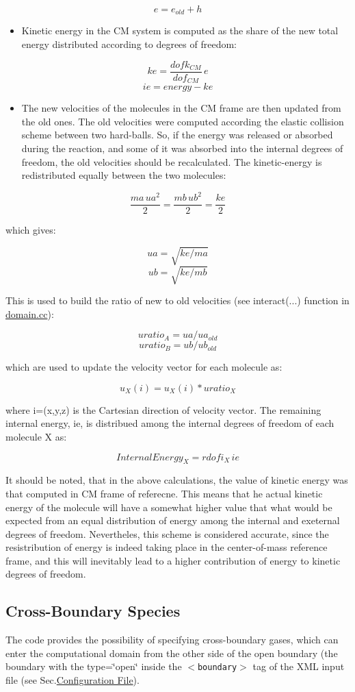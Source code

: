 \[ e = e_{old} + h \]

\begin{itemize}
\item Kinetic energy in the CM system is computed as the share of the new total energy distributed according to degrees of freedom:\end{itemize}


\[ ke = \frac{dofk_{CM}}{dof_{CM}}\,e \] \[ ie = energy - ke \]

\begin{itemize}
\item The new velocities of the molecules in the CM frame are then updated from the old ones. The old velocities were computed according the elastic collision scheme between two hard-balls. So, if the energy was released or absorbed during the reaction, and some of it was absorbed into the internal degrees of freedom, the old velocities should be recalculated. The kinetic-energy is redistributed equally between the two molecules:\end{itemize}


\[\frac{ma\,ua^2}{2} = \frac{mb\,ub^2}{2} = \frac{ke}{2} \]

which gives:

\[ ua = \sqrt{ke/ma} \] \[ ub = \sqrt{ke/mb} \]

This is used to build the ratio of new to old velocities (see interact(...) function in \hyperlink{domain_8cc}{domain.cc}):

\[ uratio_A = ua/ua_{old} \] \[ uratio_B = ub/ub_{old} \]

which are used to update the velocity vector for each molecule as:

\[ u_X(i) = u_X(i)*uratio_X \]

where i=(x,y,z) is the Cartesian direction of velocity vector. The remaining internal energy, ie, is distribued among the internal degrees of freedom of each molecule X as:

\[ InternalEnergy_X = rdofi_X\,ie \]

It should be noted, that in the above calculations, the value of kinetic energy was that computed in CM frame of referecne. This means that he actual kinetic energy of the molecule will have a somewhat higher value that what would be expected from an equal distribution of energy among the internal and exeternal degrees of freedom. Nevertheles, this scheme is considered accurate, since the resistribution of energy is indeed taking place in the center-of-mass reference frame, and this will inevitably lead to a higher contribution of energy to kinetic degrees of freedom.\hypertarget{Model_SSec}{}\subsection{Cross-Boundary Species}\label{Model_SSec}
The code provides the possibility of specifying cross-boundary gases, which can enter the computational domain from the other side of the open boundary (the boundary with the type=\char`\"{}open\char`\"{} inside the {\tt $<$boundary$>$} tag of the XML input file (see Sec.\hyperlink{Configfile_SecConfig}{Configuration File}).

